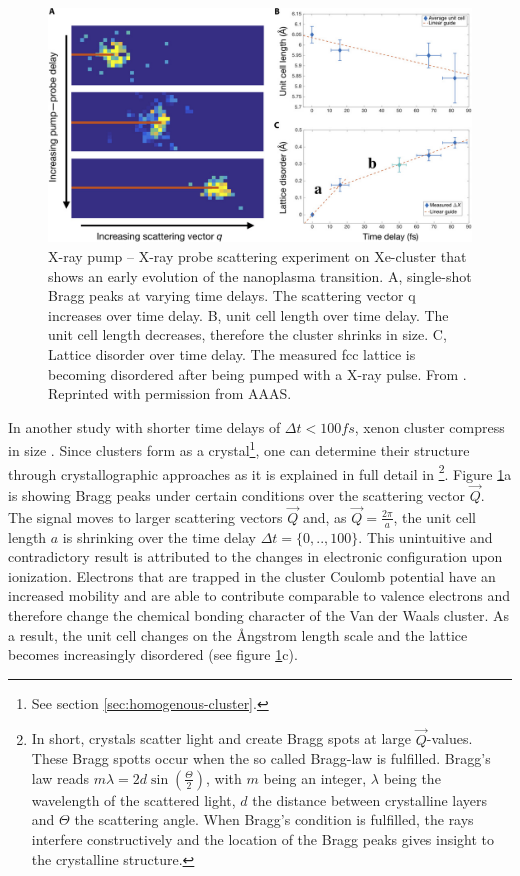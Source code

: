 \begin{figure}
	\centering
		\includegraphics[width=1.00\textwidth]{images/ken-science.jpg}
	\caption[Experiment that shows early evolution of the nanoplasma transition.]{X-ray pump -- X-ray probe scattering experiment on Xe-cluster that shows an early evolution of the nanoplasma transition. A, single-shot Bragg peaks at varying time delays. The scattering vector q increases over time delay. B, unit cell length over time delay. The unit cell length decreases, therefore the cluster shrinks in size. C, Lattice disorder over time delay. The measured fcc lattice is becoming disordered after being pumped with a X-ray pulse. From \citep{Ferguson-2016-SciAdv}. Reprinted with permission from AAAS.}
	\label{fig:ken-science}
\end{figure}
In another study with shorter time delays of $\Delta t<100 fs$, xenon cluster compress in size \citep{Ferguson-2016-SciAdv}. Since clusters form as a crystal\footnote{See section \ref{sec:homogenous-cluster}.}, one can determine their structure through crystallographic approaches as it is explained in full detail in \citep[][chapter 5]{Als-Nielson-2011-JWS}\footnote{In short, crystals scatter light and create Bragg spots at large $\vec{Q}$-values. These Bragg spotts occur when the so called Bragg-law is fulfilled. Bragg's law reads $m \lambda = 2d \sin\left(\frac{\Theta}{2}\right)$, with $m$ being an integer, $\lambda$ being the wavelength of the scattered light, $d$ the distance between crystalline layers and $\Theta$ the scattering angle. When Bragg's condition is fulfilled, the rays interfere constructively and the location of the Bragg peaks gives insight to the crystalline structure.}. Figure \ref{fig:ken-science}a is showing Bragg peaks under certain conditions over the scattering vector $\vec{Q}$. The signal moves to larger scattering vectors $\vec{Q}$ and, as $\vec{Q}=\frac{2\pi}{a}$, the unit cell length $a$ is shrinking over the time delay $\Delta t = \{0,..,100\}$. This unintuitive and contradictory result is attributed to the changes in electronic configuration upon ionization. Electrons that are trapped in the cluster Coulomb potential have an increased mobility and are able to contribute comparable to valence electrons and therefore change the chemical bonding character of the Van der Waals cluster. As a result, the unit cell changes on the {\AA}ngstrom length scale and the lattice becomes increasingly disordered (see figure \ref{fig:ken-science}c).\\
